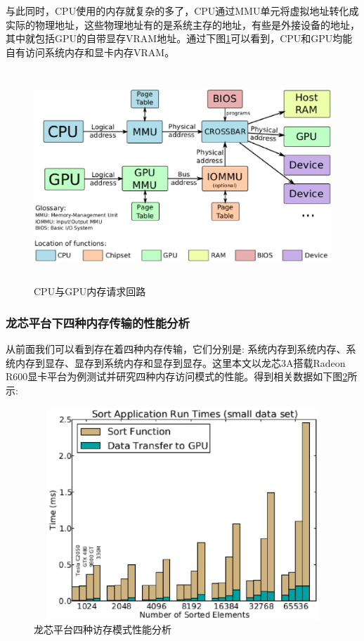 与此同时，CPU使用的内存就复杂的多了，CPU通过MMU单元将虚拟地址转化成实际的物理地址，这些物理地址有的是系统主存的地址，有些是外接设备的地址，其中就包括GPU的自带显存VRAM地址。通过下图\ref{fig:cpu-gpu-mm}可以看到，CPU和GPU均能自有访问系统内存和显卡内存VRAM。

\begin{figure}[H] 
  \centering
  \includegraphics[width=12cm,height=8cm]{figures/chap03/cpu-gpu-mm}
  \caption{CPU与GPU内存请求回路}
  \label{fig:cpu-gpu-mm}
\end{figure}

\subsubsection{龙芯平台下四种内存传输的性能分析}

从前面我们可以看到存在着四种内存传输，它们分别是: 系统内存到系统内存、系统内存到显存、显存到系统内存和显存到显存。这里本文以龙芯3A搭载Radeon R600显卡平台为例测试并研究四种内存访问模式的性能。得到相关数据如下图\ref{fig:memcpy-performance}所示:

\begin{figure}[H] 
  \centering
  \includegraphics[width=12cm,height=8cm]{figures/chap03/memcpy-performance}
  \caption{龙芯平台四种访存模式性能分析}
  \label{fig:memcpy-performance}
\end{figure}

